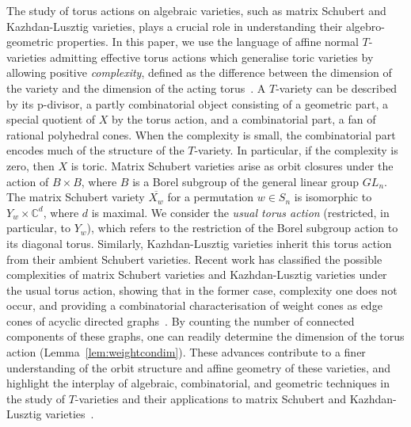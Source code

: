 \documentclass[11pt]{amsart}
\theoremstyle{definition}
\theoremstyle{definition}
\theoremstyle{definition}
\theoremstyle{definition}
\begin{document}
The study of torus actions on algebraic varieties, such as matrix Schubert and Kazhdan-Lusztig varieties, plays a crucial role in understanding their algebro-geometric properties. In this paper, we use the language of affine normal $T$-varieties admitting effective torus actions which generalise toric varieties by allowing positive \emph{complexity}, defined as the difference between the dimension of the variety and the dimension of the acting torus~\cite{altmann2012geometry}. A $T$-variety can be described by its p-divisor, a partly combinatorial object consisting of a geometric part, a special quotient of $X$ by the torus action, and a combinatorial part, a fan of rational polyhedral cones. When the complexity is small, the combinatorial part encodes much of the structure of the $T$-variety. In particular, if the complexity is zero, then $X$ is toric. Matrix Schubert varieties arise as orbit closures under the action of $B \times B$, where $B$ is a Borel subgroup of the general linear group $GL_n$. The matrix Schubert variety $\overline{X_w}$ for a permutation $w \in S_n$ is isomorphic to $Y_w \times \mathbb{C}^d$, where $d$ is maximal. We consider the \emph{usual torus action} (restricted, in particular, to $Y_w$), which refers to the restriction of the Borel subgroup action to its diagonal torus. Similarly, Kazhdan-Lusztig varieties inherit this torus action from their ambient Schubert varieties. Recent work has classified the possible complexities of matrix Schubert varieties and Kazhdan-Lusztig varieties under the usual torus action, showing that in the former case, complexity one does not occur, and providing a combinatorial characterisation of weight cones as edge cones of acyclic directed graphs~\cite{donten2021complexity}. By counting the number of connected components of these graphs, one can readily determine the dimension of the torus action (Lemma~\ref{lem:weightcondim}). These advances contribute to a finer understanding of the orbit structure and affine geometry of these varieties, and highlight the interplay of algebraic, combinatorial, and geometric techniques in the study of $T$-varieties and their applications to matrix Schubert and Kazhdan-Lusztig varieties~\cite{portakal2023rigid}.
\end{document}
